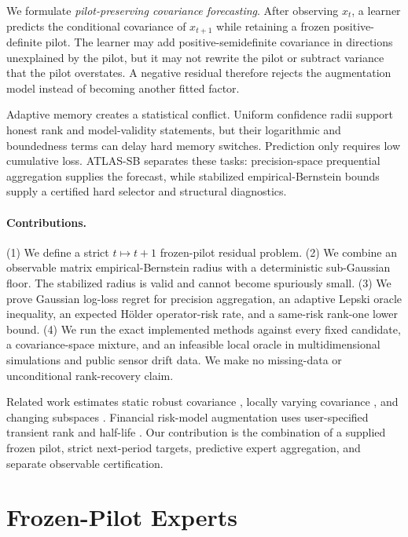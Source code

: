 \documentclass{article}
\theoremstyle{definition}
\theoremstyle{remark}
\begin{document}
We formulate \emph{pilot-preserving covariance forecasting}.  After observing $x_t$, a learner predicts the conditional covariance of $x_{t+1}$ while retaining a frozen positive-definite pilot.  The learner may add positive-semidefinite covariance in directions unexplained by the pilot, but it may not rewrite the pilot or subtract variance that the pilot overstates.  A negative residual therefore rejects the augmentation model instead of becoming another fitted factor.

Adaptive memory creates a statistical conflict.  Uniform confidence radii support honest rank and model-validity statements, but their logarithmic and boundedness terms can delay hard memory switches.  Prediction only requires low cumulative loss.  ATLAS-SB separates these tasks: precision-space prequential aggregation supplies the forecast, while stabilized empirical-Bernstein bounds supply a certified hard selector and structural diagnostics.

\paragraph{Contributions.}
(1) We define a strict $t\mapsto t+1$ frozen-pilot residual problem.  (2) We combine an observable matrix empirical-Bernstein radius with a deterministic sub-Gaussian floor.  The stabilized radius is valid and cannot become spuriously small.  (3) We prove Gaussian log-loss regret for precision aggregation, an adaptive Lepski oracle inequality, an expected H\"older operator-risk rate, and a same-risk rank-one lower bound.  (4) We run the exact implemented methods against every fixed candidate, a covariance-space mixture, and an infeasible local oracle in multidimensional simulations and public sensor drift data.  We make no missing-data or unconditional rank-recovery claim.

Related work estimates static robust covariance \citep{ledoit2004well,fan2013poc}, locally varying covariance \citep{chen2013covariance,fryzlewicz2013volatility,dendramis2021timevarying,jung2019timevarying}, and changing subspaces \citep{balzano2010grouse,narayanamurthy2018norst}.  Financial risk-model augmentation uses user-specified transient rank and half-life \citep{tzikas2026transient}.  Our contribution is the combination of a supplied frozen pilot, strict next-period targets, predictive expert aggregation, and separate observable certification.

\section{Frozen-Pilot Experts}
\label{sec:model}
\end{document}
